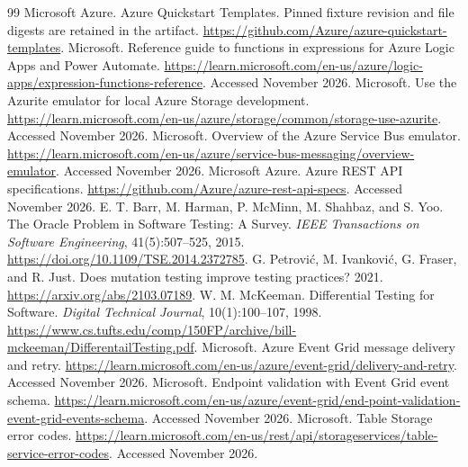 \documentclass[10pt,a4paper]{article}
\begin{document}
\begin{thebibliography}{99}
 Microsoft Azure. Azure Quickstart Templates. Pinned fixture revision and file digests are retained in the artifact. \url{https://github.com/Azure/azure-quickstart-templates}.
 Microsoft. Reference guide to functions in expressions for Azure Logic Apps and Power Automate. \url{https://learn.microsoft.com/en-us/azure/logic-apps/expression-functions-reference}. Accessed November 2026.
 Microsoft. Use the Azurite emulator for local Azure Storage development. \url{https://learn.microsoft.com/en-us/azure/storage/common/storage-use-azurite}. Accessed November 2026.
 Microsoft. Overview of the Azure Service Bus emulator. \url{https://learn.microsoft.com/en-us/azure/service-bus-messaging/overview-emulator}. Accessed November 2026.
 Microsoft Azure. Azure REST API specifications. \url{https://github.com/Azure/azure-rest-api-specs}. Accessed November 2026.
 E. T. Barr, M. Harman, P. McMinn, M. Shahbaz, and S. Yoo. The Oracle Problem in Software Testing: A Survey. \emph{IEEE Transactions on Software Engineering}, 41(5):507--525, 2015. \url{https://doi.org/10.1109/TSE.2014.2372785}.
 G. Petrovi\'{c}, M. Ivankovi\'{c}, G. Fraser, and R. Just. Does mutation testing improve testing practices? 2021. \url{https://arxiv.org/abs/2103.07189}.
 W. M. McKeeman. Differential Testing for Software. \emph{Digital Technical Journal}, 10(1):100--107, 1998. \url{https://www.cs.tufts.edu/comp/150FP/archive/bill-mckeeman/DifferentailTesting.pdf}.
 Microsoft. Azure Event Grid message delivery and retry. \url{https://learn.microsoft.com/en-us/azure/event-grid/delivery-and-retry}. Accessed November 2026.
 Microsoft. Endpoint validation with Event Grid event schema. \url{https://learn.microsoft.com/en-us/azure/event-grid/end-point-validation-event-grid-events-schema}. Accessed November 2026.
 Microsoft. Table Storage error codes. \url{https://learn.microsoft.com/en-us/rest/api/storageservices/table-service-error-codes}. Accessed November 2026.
\end{thebibliography}
\end{document}
